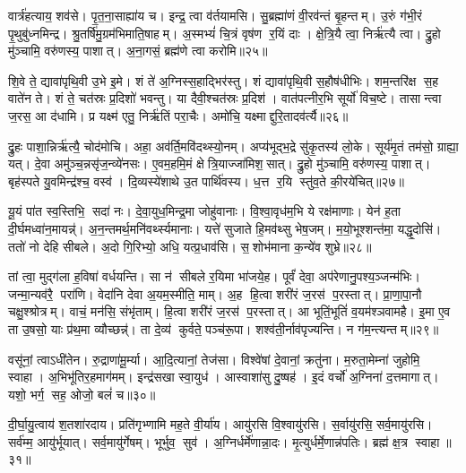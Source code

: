 वार्त्र॑हत्याय॒ शव॑से। पृ॒त॒ना॒साह्या॑य च। इन्द्र॒ त्वा व॑र्तयामसि। सु॒ब्रह्मा॑णं वी॒रव॑न्तं बृ॒हन्तम्। उ॒रुं ग॑भी॒रं पृ॒थुबु॑ध्नमिन्द्र। श्रु॒तर्\mbox{}षि॑मु॒ग्रम॑भिमाति॒षाहम्। अ॒स्मभ्यं॑ चि॒त्रं वृष॑ण र॒यिं दाः। क्षे॒त्रि॒यै त्वा॒ निर्\mbox{}ऋ॑त्यै त्वा। द्रु॒हो मु॑ञ्चामि॒ वरु॑णस्य॒ पाशात्। अ॒ना॒गसं॒ ब्रह्म॑णे त्वा करोमि॥२५॥

शि॒वे ते॒ द्यावा॑पृथि॒वी उ॒भे इ॒मे। शं ते॑ अ॒ग्निस्स॒हाद्भिर॑स्तु। शं द्यावा॑पृथि॒वी स॒हौष॑धीभिः। शम॒न्तरि॑क्ष स॒ह वाते॑न ते। शं ते॒ चत॑स्रः प्र॒दिशो॑ भवन्तु। या दैवी॒श्चत॑स्रः प्र॒दिश॑। वात॑पत्नीर॒भि सूर्यो॑ विच॒ष्टे। तासान्त्वा ज॒रस॒ आ द॑धामि। प्र यक्ष्म॑ एतु॒ निर्\mbox{}ऋ॑तिं परा॒चैः। अमो॑चि॒ यक्ष्माद्दुरि॒तादव॑र्त्यै॥२६॥

द्रु॒हः पाशा॒न्निर्\mbox{}ऋ॑त्यै॒ चोद॑मोचि। अहा॒ अव॑र्ति॒मवि॑दथ्स्यो॒नम्। अप्य॑भूद्भ॒द्रे सु॑कृ॒तस्य॑ लो॒के। सूर्य॑मृ॒तं तम॑सो॒ ग्राह्या॒ यत्। दे॒वा अमु॑ञ्च॒न्नसृ॑ज॒न्व्ये॑नसः। ए॒वम॒हमि॒मं क्षेत्रि॒याज्जा॑मिश॒सात्। द्रु॒हो मु॑ञ्चामि॒ वरु॑णस्य॒ पाशात्। बृह॑स्पते यु॒वमिन्द्र॑श्च॒ वस्व॑। दि॒व्यस्ये॑शाथे उ॒त पार्थि॑वस्य। ध॒त्त र॒यि स्तु॑व॒ते की॒रये॑चित्॥२७॥

यू॒यं पा॑त स्व॒स्तिभि॒ सदा॑ नः। दे॒वा॒युध॒मिन्द्र॒मा जोहु॑वानाः। वि॒श्वा॒वृध॑म॒भि ये रक्ष॑माणाः। येन॑ ह॒ता दी॒र्घमध्वा॑न॒मायन्न्॑। अ॒न॒न्तमर्थ॒मनि॑वर्थ्स्यमानाः। यत्ते॑ सुजाते हि॒मव॑थ्सु भेष॒जम्। म॒यो॒भूश्शन्त॑मा॒ यद्धृ॒दोसि॑। ततो॑ नो देहि सीबले। अ॒दो गि॒रिभ्यो॒ अधि॒ यत्प्र॒धाव॑सि। स॒शोभ॑माना क॒न्ये॑व शुभ्रे॥२८॥

तां त्वा॒ मुद्ग॑ला ह॒विषा॑ वर्धयन्ति। सा न॑ सीबले र॒यिमा भा॑जये॒ह। पूर्वं॑ देवा॒ अप॑रेणानु॒पश्य॒ञ्जन्म॑भिः। जन्मा॒न्यव॑रै॒ परा॑णि। वेदा॑नि देवा अ॒यम॒स्मीति॒ माम्। अ॒ह हि॒त्वा शरी॑रं ज॒रस॑ प॒रस्तात्। प्रा॒णा॒पा॒नौ चक्षु॒श्श्रोत्रम्। वाचं॒ मन॑सि॒ संभृ॑ताम्। हि॒त्वा शरी॑रं ज॒रस॑ प॒रस्तात्। आ भूतिं॒भूतिं॑ व॒यम॑श्ञवामहै। इ॒मा ए॒व ता उ॒षसो॒ याः प्र॑थ॒मा व्यौच्छन्न्॑। ता दे॒व्य॑ कुर्वते॒ पञ्च॑रू॒पा। शश्व॑ती॒र्नाव॑पृज्यन्ति। न ग॑म॒न्त्यन्तम्॥२९॥\anuvakamend[क॒रो॒म्यव॑र्त्यै चिच्छुभ्रेऽश्ञवामहै च॒त्वारि॑ च]

वसू॑नां॒ त्वाऽधी॑तेन। रु॒द्राणा॑मू॒र्म्या। आ॒दि॒त्यानां॒ तेज॑सा। विश्वे॑षां दे॒वानां॒ क्रतु॑ना। म॒रुता॒मेम्ना॑ जुहोमि॒ स्वाहा। अ॒भिभू॑तिर॒हमाग॑मम्। इन्द्र॑सखा स्वा॒युध॑। आस्वाशा॑सु दु॒ष्षह॑। इ॒दं वर्चो॑ अ॒ग्निना॑ द॒त्तमागात्। यशो॒ भर्ग॒ सह॒ ओजो॒ बलं॑ च॥३०॥

दी॒र्घा॒यु॒त्वाय॑ श॒तशा॑रदाय। प्रति॑गृभ्णामि मह॒ते वी॒र्या॑य। आयु॑रसि वि॒श्वायु॑रसि। स॒र्वायु॑रसि॒ सर्व॒मायु॑रसि। सर्व॑म्म॒ आयु॑र्भूयात्। सर्व॒मायु॑र्गेषम्। भूर्भुव॒ सुव॑। अ॒ग्निर्धर्मे॑णान्ना॒दः। मृ॒त्युर्धर्मे॒णान्न॑पतिः। ब्रह्म॑ क्ष॒त्र स्वाहा॥३१॥

